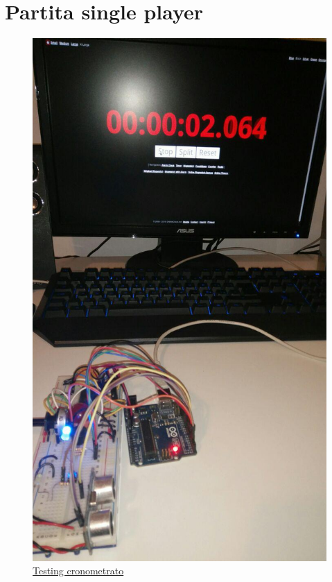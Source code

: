 \newpage
\section{Partita single player}
\begin{figure}[!ht]
	\centering
	\includegraphics[scale=.25]{img/testing/testing1.jpg}
	\caption{\href{https://youtu.be/X0QOKkfVF4Y}{Testing cronometrato}}
\end{figure}

